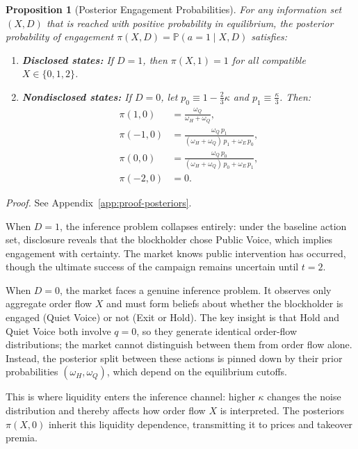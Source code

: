 \documentclass[11pt]{article}
\newtheorem{proposition}{Proposition}
\newcommand{\PP}{\mathbb{P}}
\newcommand{\1}{\mathbf{1}}
\begin{document}
\begin{proposition}[Posterior Engagement Probabilities]
\label{prop:posteriors}
For any information set $(X,D)$ that is reached with positive probability in equilibrium, the posterior probability of engagement $\pi(X,D) = \PP(a=1 \mid X, D)$ satisfies:
\begin{enumerate}[label=(\alph*)]
\item \textbf{Disclosed states:} If $D = 1$, then $\pi(X, 1) = 1$ for all compatible $X \in \{0, 1, 2\}$.
\item \textbf{Nondisclosed states:} If $D = 0$, let $p_0 \equiv 1 - \frac{2}{3}\kappa$ and $p_1 \equiv \frac{\kappa}{3}$. Then:
\begin{align*}
\pi(1, 0) &= \frac{\omega_Q}{\omega_H + \omega_Q}, \\
\pi(-1, 0) &= \frac{\omega_Q \, p_1}{(\omega_H + \omega_Q) \, p_1 + \omega_E \, p_0}, \\
\pi(0, 0) &= \frac{\omega_Q \, p_0}{(\omega_H + \omega_Q) \, p_0 + \omega_E \, p_1}, \\
\pi(-2, 0) &= 0.
\end{align*}
\end{enumerate}
\end{proposition}
\textit{Proof.} See Appendix~\ref{app:proof-posteriors}.

When $D=1$, the inference problem collapses entirely: under the baseline action set, disclosure reveals that the blockholder chose Public Voice, which implies engagement with certainty. The market knows public intervention has occurred, though the ultimate success of the campaign remains uncertain until $t=2$.

When $D=0$, the market faces a genuine inference problem. It observes only aggregate order flow $X$ and must form beliefs about whether the blockholder is engaged (Quiet Voice) or not (Exit or Hold). The key insight is that Hold and Quiet Voice both involve $q=0$, so they generate identical order-flow distributions; the market cannot distinguish between them from order flow alone. Instead, the posterior split between these actions is pinned down by their prior probabilities $(\omega_H,\omega_Q)$, which depend on the equilibrium cutoffs.

This is where liquidity enters the inference channel: higher $\kappa$ changes the noise distribution and thereby affects how order flow $X$ is interpreted. The posteriors $\pi(X,0)$ inherit this liquidity dependence, transmitting it to prices and takeover premia.
\end{document}

